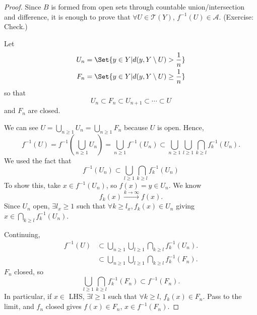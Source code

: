 \documentclass{article}
\begin{document}
\begin{proof}
    Since $B$ is formed from open sets through countable union/intersection and difference, it is enough to prove that $\forall U \in \mathscr{T}(Y)$, $f^{-1}(U) \in \mathscr{A}$. (Exercise: Check.)

    Let
    \begin{align*}
        U_n &= \Set{y \in Y | d(y, Y \setminus U) > \frac{1}{n}} \\
        F_n &= \Set{y \in Y | d(y, Y \setminus U) \geq \frac{1}{n}}
    \end{align*}
    so that
    \begin{equation*}
        U_n \subset F_n \subset U_{n+1} \subset \dotsb \subset U
    \end{equation*}
    and $F_n$ are closed.

    We can see $U = \bigcup_{n \geq 1} U_n = \bigcup_{n \geq 1} F_n$ because $U$ is open. %
    Hence,
    \begin{equation*}
        f^{-1}(U) = f^{-1} \left(\bigcup_{n \geq 1} U_n\right) = \bigcup_{n \geq 1} f^{-1}(U_n) \subset \bigcup_{n \geq 1} \bigcup_{l \geq 1} \bigcap_{k \geq l} f^{-1}_k(U_n).
    \end{equation*}
    We used the fact that
    \begin{equation*}f^{-1}(U_n) \subset \bigcup_{l \geq 1} \bigcap_{k \geq l} f_k^{-1}(U_n)\end{equation*}
    To show this, take $x \in f^{-1}(U_n)$, so $f(x) = y \in U_n$.
    We know
    \begin{equation*}
        f_k(x) \xrightarrow{k \to \infty} f(x).
    \end{equation*}
    Since $U_n$ open, $\exists l_x \geq 1$ such that $\forall k \geq l_x, f_k(x) \in U_n$ giving $x \in \bigcap_{k \geq l} f_k^{-1}(U_n)$.

    Continuing,
    \begin{align*}
        f^{-1}(U) &\subset \bigcup_{n \geq 1} \bigcup_{l \geq 1} \bigcap_{k \geq l} f_k^{-1}(U_n). \\
        &\subset \bigcup_{n \geq 1} \bigcup_{l \geq 1} \bigcap_{k \geq l} f_k^{-1}(F_n).
    \end{align*}
    $F_n$ closed, so
    \begin{equation*}
        \bigcup_{l \geq 1} \bigcap_{k \geq l} f_k^{-1} (F_n) \subset f^{-1}(F_n).
    \end{equation*}
    In particular, if $x \in$ LHS, $\exists l \geq 1$ such that $\forall k \geq l$, $f_k(x) \in F_n$.
    Pass to the limit, and $f_n$ closed gives $f(x) \in F_n$, $x \in f^{-1}(F_n)$.


\end{proof}
\end{document}
